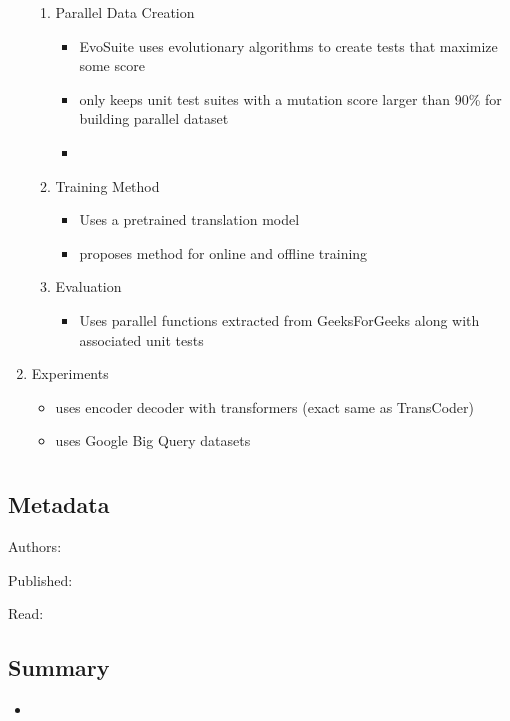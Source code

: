 \documentclass{article}
\begin{document}
\begin{enumerate}
\begin{enumerate}
		\item Parallel Data Creation
		\begin{itemize}
			\item EvoSuite uses evolutionary algorithms to create tests that maximize some score
			\item only keeps unit test suites with a mutation score larger than 90\% for building parallel dataset
			\item
		\end{itemize}
		\item Training Method
		\begin{itemize}
			\item Uses a pretrained translation model
			\item proposes method for online and offline training
		\end{itemize}
		\item Evaluation
		\begin{itemize}
			\item Uses parallel functions extracted from GeeksForGeeks along with associated unit tests
		\end{itemize}
	\end{enumerate}
	\item Experiments
	\begin{itemize}
		\item uses encoder decoder with transformers (exact same as TransCoder)
		\item uses Google Big Query datasets
	\end{itemize}
\end{enumerate}

\pagebreak


\section*{}

\subsection*{Metadata}

\noindent Authors:

\noindent Published:

\noindent Read:

\subsection*{Summary}
\begin{itemize}
	\item 
\end{itemize}
\end{document}

